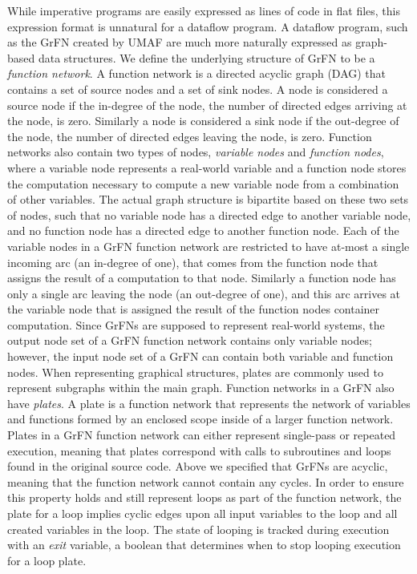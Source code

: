 While imperative programs are easily expressed as lines of code in flat files, this expression format is unnatural for a dataflow program.
A dataflow program, such as the GrFN created by UMAF are much more naturally expressed as graph-based data structures.
We define the underlying structure of GrFN to be a \emph{function network}.
A function network is a directed acyclic graph (DAG) \citep{bondy1976graph} that contains a set of source nodes and a set of sink nodes.
A node is considered a source node if the in-degree of the node, the number of directed edges arriving at the node, is zero.
Similarly a node is considered a sink node if the out-degree of the node, the number of directed edges leaving the node, is zero.
Function networks also contain two types of nodes, \textit{variable nodes} and \textit{function nodes}, where a variable node represents a real-world variable and a function node stores the computation necessary to compute a new variable node from a combination of other variables.
The actual graph structure is bipartite \citep{chartrand1977introGraphTheory} based on these two sets of nodes, such that no variable node has a directed edge to another variable node, and no function node has a directed edge to another function node.
Each of the variable nodes in a GrFN function network are restricted to have at-most a single incoming arc (an in-degree of one), that comes from the function node that assigns the result of a computation to that node.
Similarly a function node has only a single arc leaving the node (an out-degree of one), and this arc arrives at the variable node that is assigned the result of the function nodes container computation.
Since GrFNs are supposed to represent real-world systems, the output node set of a GrFN function network contains only variable nodes; however, the input node set of a GrFN can contain both variable and function nodes.
When representing graphical structures, plates are commonly used to represent subgraphs within the main graph.
Function networks in a GrFN also have \textit{plates}.
A plate is a function network that represents the network of variables and functions formed by an enclosed scope inside of a larger function network.
Plates in a GrFN function network can either represent single-pass or repeated execution, meaning that plates correspond with calls to subroutines and loops found in the original source code.
Above we specified that GrFNs are acyclic, meaning that the function network cannot contain any cycles.
In order to ensure this property holds and still represent loops as part of the function network, the plate for a loop implies cyclic edges upon all input variables to the loop and all created variables in the loop.
The state of looping is tracked during execution with an \textit{exit} variable, a boolean that determines when to stop looping execution for a loop plate.

